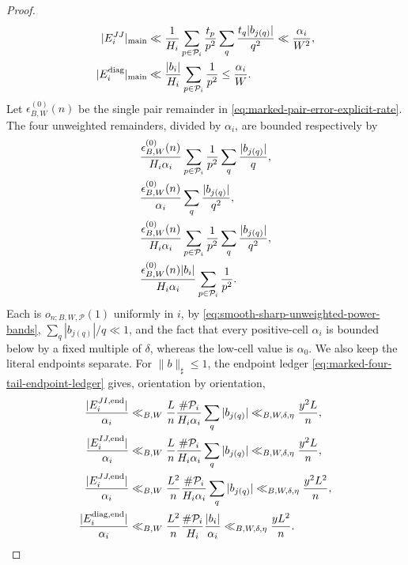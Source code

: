 \documentclass[11pt]{article}
\numberwithin{equation}{section}
\theoremstyle{definition}
\theoremstyle{remark}
\newcommand{\1}{\mathbf 1}
\begin{document}
\begin{proof}
\begin{align}
 |E_i^{JJ}|_{\rm main}
 &\ll \frac1{H_i}\sum_{p\in\mathcal P_i}\frac{t_p}{p^2}
       \sum_q\frac{t_q|b_{j(q)}|}{q^2}
 \ll\frac{\alpha_i}{W^2},\notag\\
 |E_i^{\rm diag}|_{\rm main}
 &\ll \frac{|b_i|}{H_i}\sum_{p\in\mathcal P_i}\frac1{p^2}
 \leq\frac{\alpha_i}{W}.
 \label{eq:smooth-sharp-four-power-main-directions}
\end{align}
Let \(\epsilon^{(0)}_{B,W}(n)\) be the single pair remainder in
\eqref{eq:marked-pair-error-explicit-rate}.  The four unweighted
remainders, divided by \(\alpha_i\), are bounded respectively by
\begin{align}
 &\frac{\epsilon^{(0)}_{B,W}(n)}{H_i\alpha_i}
       \sum_{p\in\mathcal P_i}\frac1{p^2}
       \sum_q\frac{|b_{j(q)}|}{q},\notag\\
 &\frac{\epsilon^{(0)}_{B,W}(n)}{\alpha_i}
       \sum_q\frac{|b_{j(q)}|}{q^2},\notag\\
 &\frac{\epsilon^{(0)}_{B,W}(n)}{H_i\alpha_i}
       \sum_{p\in\mathcal P_i}\frac1{p^2}
       \sum_q\frac{|b_{j(q)}|}{q^2},\notag\\
 &\frac{\epsilon^{(0)}_{B,W}(n)|b_i|}{H_i\alpha_i}
       \sum_{p\in\mathcal P_i}\frac1{p^2}.
 \label{eq:smooth-sharp-four-power-error-directions}
\end{align}
Each is \(o_{n;B,W,\mathcal P}(1)\) uniformly in \(i\), by
\eqref{eq:smooth-sharp-unweighted-power-bands},
\(\sum_q|b_{j(q)}|/q\ll1\), and the fact that every positive-cell
\(\alpha_i\) is bounded below by a fixed multiple of \(\delta\), whereas
the low-cell value is \(\alpha_0\).  We also keep the literal endpoints
separate.  For \(\|b\|_\sharp\leq1\), the endpoint ledger
\eqref{eq:marked-four-tail-endpoint-ledger} gives, orientation by
orientation,
\begin{align}
 \frac{|E_i^{JI,\mathrm{end}}|}{\alpha_i}
 &\ll_{B,W}\frac Ln\frac{\#\mathcal P_i}{H_i\alpha_i}
       \sum_q|b_{j(q)}|
 \ll_{B,W,\delta,\eta}\frac{y^2L}{n},\notag\\
 \frac{|E_i^{IJ,\mathrm{end}}|}{\alpha_i}
 &\ll_{B,W}\frac Ln\frac{\#\mathcal P_i}{H_i\alpha_i}
       \sum_q|b_{j(q)}|
 \ll_{B,W,\delta,\eta}\frac{y^2L}{n},\notag\\
 \frac{|E_i^{JJ,\mathrm{end}}|}{\alpha_i}
 &\ll_{B,W}\frac {L^2}n\frac{\#\mathcal P_i}{H_i\alpha_i}
       \sum_q|b_{j(q)}|
 \ll_{B,W,\delta,\eta}\frac{y^2L^2}{n},\notag\\
 \frac{|E_i^{\mathrm{diag,end}}|}{\alpha_i}
 &\ll_{B,W}\frac {L^2}n\frac{\#\mathcal P_i}{H_i}
       \frac{|b_i|}{\alpha_i}
 \ll_{B,W,\delta,\eta}\frac{yL^2}{n}.

\end{align}
\end{proof}
\end{document}
